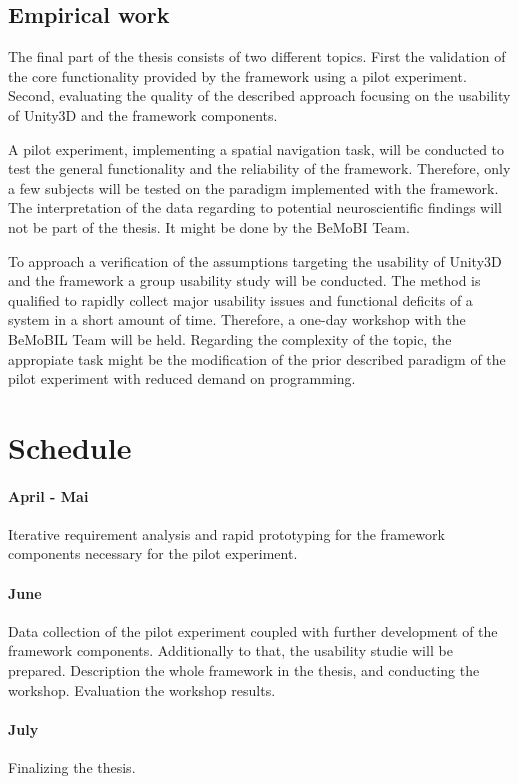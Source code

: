 \documentclass[	DIV=calc, paper=a4,	fontsize=11pt, twocolumn]{scrartcl}
\begin{document}
\subsection*{Empirical work}

The final part of the thesis consists of two different topics. First the validation of the core functionality provided by the framework using a pilot experiment. Second, evaluating the quality of the described approach focusing on the usability of Unity3D and the framework components.

A pilot experiment, implementing a spatial navigation task, will be conducted to test the general functionality and the reliability of the framework. Therefore, only a few subjects will be tested on the paradigm implemented with the framework. The interpretation of the data regarding to potential neuroscientific findings will not be part of the thesis. It might be done by the BeMoBI Team. 

To approach a verification of the assumptions targeting the usability of Unity3D and the framework a group usability study will be conducted. The method is qualified to rapidly collect major usability issues and functional deficits of a system in a short amount of time.\cite{downey2007group}
Therefore, a one-day workshop with the BeMoBIL Team will be held. Regarding the complexity of the topic, the appropiate task might be the modification of the prior described paradigm of the pilot experiment with reduced demand on programming.

\section*{Schedule}

\paragraph{April - Mai} Iterative requirement analysis and rapid prototyping for the framework components necessary for the pilot experiment.
\paragraph{June} Data collection of the pilot experiment coupled with further development of the framework components. Additionally to that, the usability studie will be prepared. Description the whole framework in the thesis, and conducting the workshop. Evaluation the workshop results. 
\paragraph{July} Finalizing the thesis. 



\end{document}
